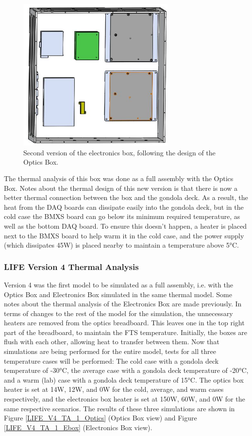 \begin{figure}
    \centering
    \includegraphics[width=0.7\textwidth]{chap3_images/LIFE_V4_images/Ebox_V2.JPG}
    \caption{Second version of the electronics box, following the design of the Optics Box.}
    \label{fig:EBOX_V2}
\end{figure}

The thermal analysis of this box was done as a full assembly with the Optics Box. Notes about the thermal design of this new version is that there is now a better thermal connection between the box and the gondola deck. As a result, the heat from the DAQ boards can dissipate easily into the gondola deck, but in the cold case the BMXS board can go below its minimum required temperature, as well as the bottom DAQ board. To ensure this doesn't happen, a heater is placed next to the BMXS board to help warm it in the cold case, and the power supply (which dissipates 45W) is placed nearby to maintain a temperature above 5°C.

\subsubsection{LIFE Version 4 Thermal Analysis}
Version 4 was the first model to be simulated as a full assembly, i.e. with the Optics Box and Electronics Box simulated in the same thermal model. Some notes about the thermal analysis of the Electronics Box are made previously. In terms of changes to the rest of the model for the simulation, the unnecessary heaters are removed from the optics breadboard. This leaves one in the top right part of the breadboard, to maintain the FTS temperature. Initially, the boxes are flush with each other, allowing heat to transfer between them. Now that simulations are being performed for the entire model, tests for all three temperature cases will be performed: The cold case with a gondola deck temperature of -30°C, the average case with a gondola deck temperature of -20°C, and a warm (lab) case with a gondola deck temperature of 15°C. The optics box heater is set at 14W, 12W, and 0W for the cold, average, and warm cases respectively, and the electronics box heater is set at 150W, 60W, and 0W for the same respective scenarios. The results of these three simulations are shown in Figure \ref{LIFE_V4_TA_1_Optics} (Optics Box view) and Figure \ref{LIFE_V4_TA_1_Ebox} (Electronics Box view).

